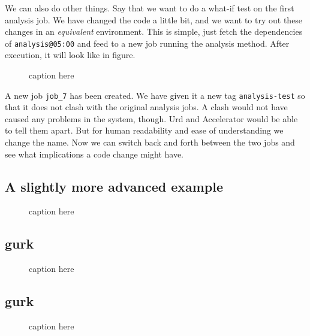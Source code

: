 \documentclass[a4paper]{article}
\begin{document}
We can also do other things.  Say that we want to do a what-if test on
the first analysis job.  We have changed the code a little bit, and we
want to try out these changes in an \textsl{equivalent} environment.
This is simple, just fetch the dependencies of \texttt{analysis@05:00}
and feed to a new job running the analysis method.  After execution,
it will look like in figure.
\begin{figure}[h!]
  \begin{center}
    
    \caption{caption here}
    \label{figure:example}
  \end{center}
\end{figure}
A new job \texttt{job\_7} has been created.  We have given it a new
tag \texttt{analysis-test} so that it does not clash with the original
analysis jobs.  A clash would not have caused any problems in the
system, though.  Urd and Accelerator would be able to tell them apart.
But for human readability and ease of understanding we change the
name.  Now we can switch back and forth between the two jobs and see
what implications a code change might have.


\subsection{A slightly more advanced example}
\begin{figure}[h!]
  \begin{center}
    
    \caption{caption here}
    \label{figure:example}
  \end{center}
\end{figure}




\subsection{gurk}
\begin{figure}[h!]
  \begin{center}
    
    \caption{caption here}
    \label{figure:example}
  \end{center}
\end{figure}

\subsection{gurk}
\begin{figure}[h!]
  \begin{center}
    
    \caption{caption here}
    \label{figure:example}
  \end{center}
\end{figure}
\end{document}
